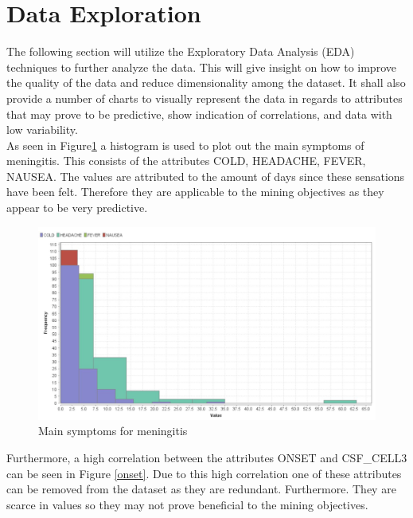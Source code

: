 \section*{Data Exploration}
The following section will utilize the Exploratory Data Analysis (EDA) techniques to further analyze the data. This will give insight on how to improve the quality of the data and reduce dimensionality among the dataset. It shall also provide a number of charts to visually represent the data in regards to attributes that may prove to be predictive, show indication of correlations, and data with low variability. \\
As seen in Figure\ref{symp} a histogram is used to plot out the main symptoms of meningitis. This consists of the attributes COLD, HEADACHE, FEVER, NAUSEA. The values are attributed to the amount of days since these sensations have been felt. Therefore they are applicable to the mining objectives as they appear to be very predictive.
\begin{figure}[ht]
	\begin{center}
		\advance\leftskip-3cm
		\advance\rightskip-3cm
		\includegraphics[keepaspectratio=true,scale=0.6]{__resources/symptoms.jpg}
		\caption{Main symptoms for meningitis}
		\label{symp}
	\end{center}
\end{figure}
\newpage
Furthermore, a high correlation between the attributes ONSET and CSF\_CELL3 can be seen in Figure \ref{onset}. Due to this high correlation one of these attributes can be removed from the dataset as they are redundant. Furthermore. They are scarce in values so they may not prove beneficial to the mining objectives.
